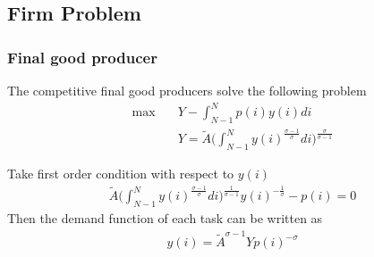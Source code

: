 \documentclass[12pt]{article}
\begin{document}
\begin{appendices}

\section{Firm Problem}

\subsubsection*{Final good producer}
The competitive final good producers solve the following problem 
\begin{align*}
\max \quad & Y-\int_{N-1}^Np(i)y(i)di \\
&Y = \tilde{A}\Big(\int_{N-1}^{N}y(i)^{\frac{\sigma-1}{\sigma}}di\Big)^{\frac{\sigma}{\sigma-1}}
\end{align*}

Take first order condition with respect to $y(i)$
\begin{align*}
\tilde{A}\Big(\int_{N-1}^{N}y(i)^{\frac{\sigma-1}{\sigma}}di\Big)^{\frac{1}{\sigma-1}}y(i)^{-\frac{1}{\sigma}}-p(i) = 0
\end{align*}
Then the demand function of each task can be written as 
\begin{align*}
y(i) = \tilde{A}^{\sigma-1}Yp(i)^{-\sigma}
\end{align*}


\end{appendices}
\end{document}
